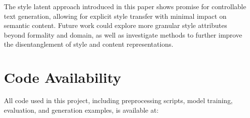 \documentclass[twocolumn]{article}
\begin{document}
The style latent approach introduced in this paper shows promise for controllable text generation, allowing for explicit style transfer with minimal impact on semantic content. Future work could explore more granular style attributes beyond formality and domain, as well as investigate methods to further improve the disentanglement of style and content representations.

\section{Code Availability}

All code used in this project, including preprocessing scripts, model training, evaluation, and generation examples, is available at:

\href{https://github.com/j6k4m8/llm_style}{\texttt{}}


\small

\end{document}
